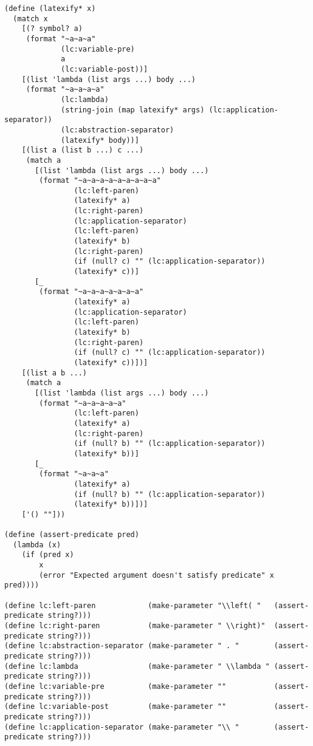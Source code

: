 \begin{verbatim}
(define (latexify* x)
  (match x
    [(? symbol? a)
     (format "~a~a~a"
             (lc:variable-pre)
             a
             (lc:variable-post))]
    [(list 'lambda (list args ...) body ...)
     (format "~a~a~a~a"
             (lc:lambda)
             (string-join (map latexify* args) (lc:application-separator))
             (lc:abstraction-separator)
             (latexify* body))]
    [(list a (list b ...) c ...)
     (match a
       [(list 'lambda (list args ...) body ...)
        (format "~a~a~a~a~a~a~a~a~a"
                (lc:left-paren)
                (latexify* a)
                (lc:right-paren)
                (lc:application-separator)
                (lc:left-paren)
                (latexify* b)
                (lc:right-paren)
                (if (null? c) "" (lc:application-separator))
                (latexify* c))]
       [_
        (format "~a~a~a~a~a~a~a"
                (latexify* a)
                (lc:application-separator)
                (lc:left-paren)
                (latexify* b)
                (lc:right-paren)
                (if (null? c) "" (lc:application-separator))
                (latexify* c))])]
    [(list a b ...)
     (match a
       [(list 'lambda (list args ...) body ...)
        (format "~a~a~a~a~a"
                (lc:left-paren)
                (latexify* a)
                (lc:right-paren)
                (if (null? b) "" (lc:application-separator))
                (latexify* b))]
       [_
        (format "~a~a~a"
                (latexify* a)
                (if (null? b) "" (lc:application-separator))
                (latexify* b))])]
    ['() ""]))

(define (assert-predicate pred)
  (lambda (x)
    (if (pred x)
        x
        (error "Expected argument doesn't satisfy predicate" x pred))))

(define lc:left-paren            (make-parameter "\\left( "   (assert-predicate string?)))
(define lc:right-paren           (make-parameter " \\right)"  (assert-predicate string?)))
(define lc:abstraction-separator (make-parameter " . "        (assert-predicate string?)))
(define lc:lambda                (make-parameter " \\lambda " (assert-predicate string?)))
(define lc:variable-pre          (make-parameter ""           (assert-predicate string?)))
(define lc:variable-post         (make-parameter ""           (assert-predicate string?)))
(define lc:application-separator (make-parameter "\\ "        (assert-predicate string?)))


\end{verbatim}

